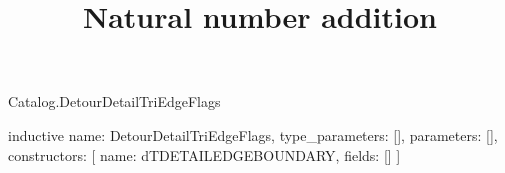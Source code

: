 \begin{lexlean}{Catalog.DetourDetailTriEdgeFlags}
\title{Natural number addition}
\begin{semanticmodule}
inductive{
  name: DetourDetailTriEdgeFlags,
  type_parameters: [],
  parameters: [],
  constructors: [
    {name: dTDETAILEDGEBOUNDARY, fields: []}
  ]
}
\end{semanticmodule}
\end{lexlean}
